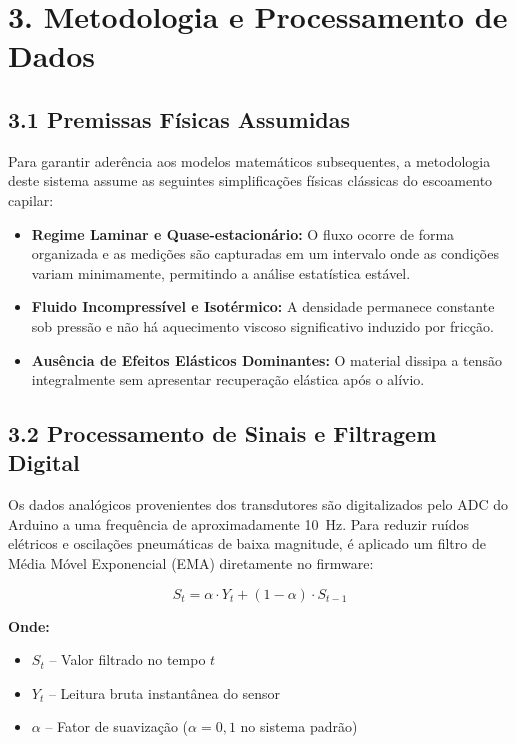 \documentclass[a4paper,12pt]{article}
\begin{document}
\section*{3. Metodologia e Processamento de Dados}

\subsection*{3.1 Premissas Físicas Assumidas}
Para garantir aderência aos modelos matemáticos subsequentes, a metodologia deste sistema assume as seguintes simplificações físicas clássicas do escoamento capilar:
\begin{itemize}
  \item \textbf{Regime Laminar e Quase-estacionário:} O fluxo ocorre de forma organizada e as medições são capturadas em um intervalo onde as condições variam minimamente, permitindo a análise estatística estável.
  \item \textbf{Fluido Incompressível e Isotérmico:} A densidade permanece constante sob pressão e não há aquecimento viscoso significativo induzido por fricção.
  \item \textbf{Ausência de Efeitos Elásticos Dominantes:} O material dissipa a tensão integralmente sem apresentar recuperação elástica após o alívio.
\end{itemize}

\subsection*{3.2 Processamento de Sinais e Filtragem Digital}
Os dados analógicos provenientes dos transdutores são digitalizados pelo ADC do Arduino a uma frequência de aproximadamente \SI{10}{Hz}. Para reduzir ruídos elétricos e oscilações pneumáticas de baixa magnitude, é aplicado um filtro de Média Móvel Exponencial (EMA) diretamente no firmware:

\begin{equation}
    S_t = \alpha \cdot Y_t + (1 - \alpha) \cdot S_{t-1}
\end{equation}

\textbf{Onde:}
\begin{itemize}[leftmargin=1.5em]
  \item $S_t$ -- Valor filtrado no tempo $t$
  \item $Y_t$ -- Leitura bruta instantânea do sensor
  \item $\alpha$ -- Fator de suavização ($\alpha = 0,1$ no sistema padrão)
\end{itemize}
\end{document}
